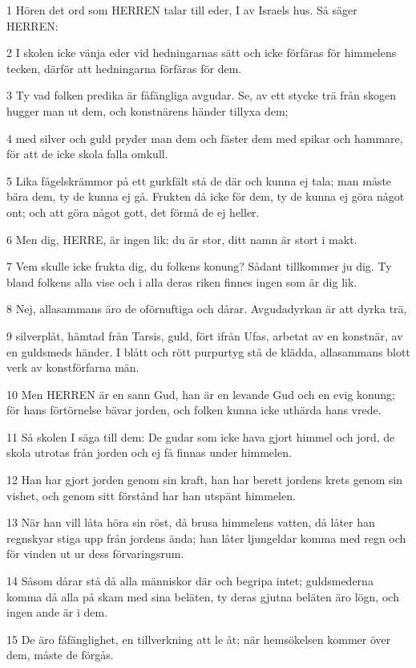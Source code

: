 \par 1 Hören det ord som HERREN talar till eder, I av Israels hus. Så säger HERREN:
\par 2 I skolen icke vänja eder vid hedningarnas sätt och icke förfäras för himmelens tecken, därför att hedningarna förfäras för dem.
\par 3 Ty vad folken predika är fåfängliga avgudar. Se, av ett stycke trä från skogen hugger man ut dem, och konstnärens händer tillyxa dem;
\par 4 med silver och guld pryder man dem och fäster dem med spikar och hammare, för att de icke skola falla omkull.
\par 5 Lika fågelskrämmor på ett gurkfält stå de där och kunna ej tala; man måste bära dem, ty de kunna ej gå. Frukten då icke för dem, ty de kunna ej göra något ont; och att göra något gott, det förmå de ej heller.
\par 6 Men dig, HERRE, är ingen lik; du är stor, ditt namn är stort i makt.
\par 7 Vem skulle icke frukta dig, du folkens konung? Sådant tillkommer ju dig. Ty bland folkens alla vise och i alla deras riken finnes ingen som är dig lik.
\par 8 Nej, allasammans äro de oförnuftiga och dårar. Avgudadyrkan är att dyrka trä,
\par 9 silverplåt, hämtad från Tarsis, guld, fört ifrån Ufas, arbetat av en konstnär, av en guldsmeds händer. I blått och rött purpurtyg stå de klädda, allasammans blott verk av konstförfarna män.
\par 10 Men HERREN är en sann Gud, han är en levande Gud och en evig konung; för hans förtörnelse bävar jorden, och folken kunna icke uthärda hans vrede.
\par 11 Så skolen I säga till dem: De gudar som icke hava gjort himmel och jord, de skola utrotas från jorden och ej få finnas under himmelen.
\par 12 Han har gjort jorden genom sin kraft, han har berett jordens krets genom sin vishet, och genom sitt förstånd har han utspänt himmelen.
\par 13 När han vill låta höra sin röst, då brusa himmelens vatten, då låter han regnskyar stiga upp från jordens ända; han låter ljungeldar komma med regn och för vinden ut ur dess förvaringsrum.
\par 14 Såsom dårar stå då alla människor där och begripa intet; guldsmederna komma då alla på skam med sina beläten, ty deras gjutna beläten äro lögn, och ingen ande är i dem.
\par 15 De äro fåfänglighet, en tillverkning att le åt; när hemsökelsen kommer över dem, måste de förgås.
